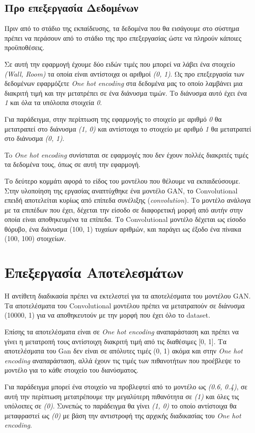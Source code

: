 \subsection{Προ επεξεργασία Δεδομένων}
Πριν από το στάδιο της εκπαίδευσης, τα δεδομένα που θα εισάγουμε στο σύστημα πρέπει να περάσουν από το στάδιο της προ επεξεργασίας ώστε να πληρούν κάποιες προϋποθέσεις.
\par
Σε αυτή την εφαρμογή έχουμε δύο ειδών τιμές που μπορεί να λάβει ένα στοιχείο \textit{(Wall, Room)} τα οποία είναι αντίστοιχα οι αριθμοί \textit{(0, 1)}. Ως προ επεξεργασία των δεδομένων εφαρμόζετε \textit{One hot encoding} στα δεδομένα μας το οποίο λαμβάνει μια διακριτή τιμή και την μετατρέπει σε ένα διάνυσμα τιμών. Το διάνυσμα αυτό έχει ένα \textit{1} και όλα τα υπόλοιπα στοιχεία \textit{0}.
\par
Για παράδειγμα, στην περίπτωση της εφαρμογής το στοιχείο με αριθμό \textit{0} θα μετατραπεί στο διάνυσμα \textit{(1, 0)} και αντίστοιχα το στοιχείο  με αριθμό \textit{1} θα μετατραπεί στο διάνυσμα \textit{(0, 1)}. 
\par
To \textit{One hot encoding} συνίσταται σε εφαρμογές που δεν έχουν πολλές διακριτές τιμές τα δεδομένα τους, όπως σε αυτή την εφαρμογή.

\par
Το δεύτερο κομμάτι αφορά το είδος του μοντέλου που θέλουμε να εκπαιδεύσουμε. Στην υλοποίηση της εργασίας αναπτύχθηκε ένα μοντέλο GAN, το Convolutional επειδή αποτελείται κυρίως από επίπεδα συνέλιξης (\textit{convolution}). Το μοντέλο ανάλογα με τα επιπέδων που έχει, δέχεται την είσοδο σε διαφορετική μορφή από αυτήν στην οποία είναι αποθηκευμένα τα επίπεδα. Το Convolutional μοντέλο δέχεται ως είσοδο θόρυβο, ένα διάνυσμα (100, 1) τυχαίων αριθμών, και παράγει ως έξοδο ένα πίνακα (100, 100) στοιχείων.
\par


\section{Επεξεργασία Αποτελεσμάτων}
Η αντίθετη διαδικασία πρέπει να εκτελεστεί για τα αποτελέσματα του μοντέλου GAN. Τα αποτελέσματα του Convolutional μοντέλου πρέπει να μετατραπούν σε διάνυσμα (10000, 1) για να αποθηκευτούν με την μορφή που έχει όλο το dataset.
\par
Επίσης τα αποτελέσματα είναι σε \textit{One hot encoding} αναπαράσταση και πρέπει να γίνει η μετατροπή τους αντίστοιχη διακριτή τιμή από τις διαθέσιμες [0, 1]. Τα αποτελέσματα του Gan δεν είναι σε απόλυτες τιμές (0, 1) ακόμα και στην \textit{One hot encoding} αναπαράσταση, αλλά έχουν τις τιμές των πιθανοτήτων που προέβλεψε το μοντέλο για το κάθε στοιχείο του διανύσματος. 
\par
Για παράδειγμα μπορεί ένα στοιχείο να προβλεφτεί από το μοντέλο ως \textit{(0.6, 0.4)}, σε αυτή την περίπτωση μετατρέπουμε την μεγαλύτερη πιθανότητα σε \textit{(1)} και όλες τις υπόλοιπες σε \textit{(0)}. Συνεπώς το παράδειγμα θα γίνει \textit{(1, 0)} το οποίο αντίστοιχα θα μεταφραστεί ως \textit{(0)} με βάση την αντιστροφή της αρχικής διαδικασίας του \textit{One hot encoding}.


